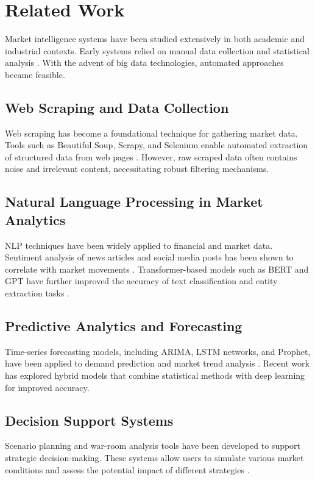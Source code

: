 \documentclass[conference]{IEEEtran}
\begin{document}
\section{Related Work}

Market intelligence systems have been studied extensively in both academic and industrial contexts. Early systems relied on manual data collection and statistical analysis \cite{b2}. With the advent of big data technologies, automated approaches became feasible.

\subsection{Web Scraping and Data Collection}
Web scraping has become a foundational technique for gathering market data. Tools such as Beautiful Soup, Scrapy, and Selenium enable automated extraction of structured data from web pages \cite{b3}. However, raw scraped data often contains noise and irrelevant content, necessitating robust filtering mechanisms.

\subsection{Natural Language Processing in Market Analytics}
NLP techniques have been widely applied to financial and market data. Sentiment analysis of news articles and social media posts has been shown to correlate with market movements \cite{b4}. Transformer-based models such as BERT and GPT have further improved the accuracy of text classification and entity extraction tasks \cite{b5}.

\subsection{Predictive Analytics and Forecasting}
Time-series forecasting models, including ARIMA, LSTM networks, and Prophet, have been applied to demand prediction and market trend analysis \cite{b6}. Recent work has explored hybrid models that combine statistical methods with deep learning for improved accuracy.

\subsection{Decision Support Systems}
Scenario planning and war-room analysis tools have been developed to support strategic decision-making. These systems allow users to simulate various market conditions and assess the potential impact of different strategies \cite{b7}.
\end{document}
